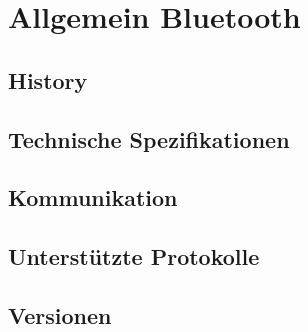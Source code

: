 \chapter{Allgemein Bluetooth}
\label{ch:general}

\section{History}

\section{Technische Spezifikationen}

\section{Kommunikation}

\section{Unterstützte Protokolle}

\section{Versionen}

